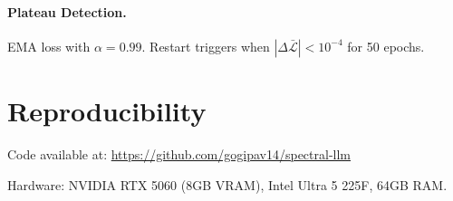 \documentclass[Royal,times,sageh]{sagej}
\begin{document}
\paragraph{Plateau Detection.} EMA loss with $\alpha = 0.99$. Restart triggers when $|\Delta\bar{\mathcal{L}}| < 10^{-4}$ for 50 epochs.

\section{Reproducibility}

Code available at: \url{https://github.com/gogipav14/spectral-llm}

Hardware: NVIDIA RTX 5060 (8GB VRAM), Intel Ultra 5 225F, 64GB RAM.
\end{document}
